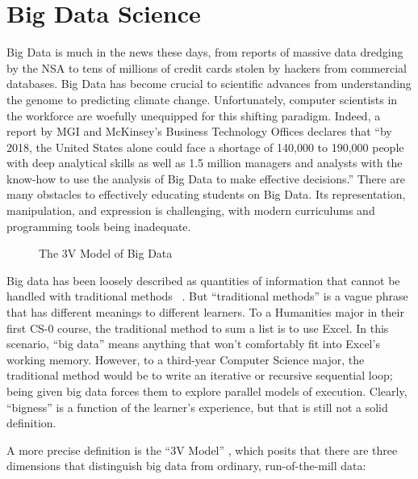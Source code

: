 \section{Big Data Science}

Big Data is much in the news these days, from reports of massive data
dredging by the NSA to tens of millions of credit cards stolen by
hackers from commercial databases.
Big Data has become crucial to scientific advances from understanding the
genome to predicting climate change.
Unfortunately, computer scientists in the workforce are woefully
unequipped for this shifting paradigm.
Indeed, a report by MGI and McKinsey's Business Technology Offices
declares that ``by 2018, the United States alone could face a
shortage of 140,000 to 190,000 people with deep analytical skills as
well as 1.5 million managers and analysts with the know-how to use the
analysis of Big Data to make effective decisions.''\cite{McKinsey}
There are many obstacles to effectively educating students on Big
Data.
Its representation, manipulation, and expression is
challenging, with modern curriculums and programming tools being
inadequate.

\begin{wrapfigure}{r}{0.5\textwidth}
    \begin{center}
    \end{center}
    \vspace{-\bigskipamount}
    \caption{The 3V Model of Big Data}
    \label{fig-3v}
\end{wrapfigure}

Big data has been loosely described as quantities of information that cannot be handled with traditional methods ~\cite{McKinsey}.
But ``traditional methods'' is a vague phrase that has different meanings to different learners. To a Humanities major in their first CS-0 course, the traditional method to sum a list is to use Excel. In this scenario, ``big data'' means anything that won't comfortably fit into Excel's working memory.
However, to a third-year Computer Science major, the traditional method would be to write an iterative or recursive sequential loop; being given big data forces them to explore parallel models of execution.
Clearly, ``bigness'' is a function of the learner's experience, but that is still not a solid definition.

A more precise definition is the ``3V Model'' \cite{douglas2012importance}, which posits that there are three dimensions that distinguish big data from ordinary, run-of-the-mill data:

